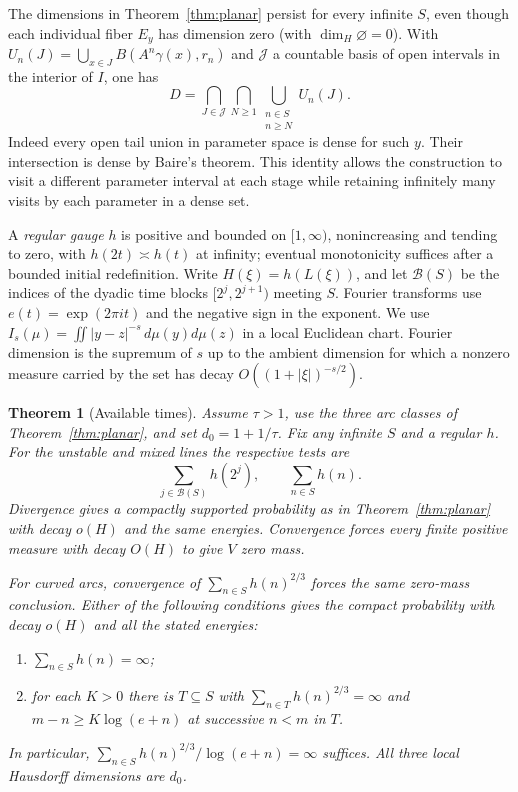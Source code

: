 \documentclass[11pt,a4paper,reqno]{amsart}
\newtheorem{theorem}{Theorem}[section]
\theoremstyle{definition}
\theoremstyle{remark}
\numberwithin{equation}{section}
\begin{document}
The dimensions in Theorem~\ref{thm:planar} persist for every infinite
\(S\), even though each individual fiber \(E_y\) has dimension zero
(with \(\dim_H\varnothing=0\)). With
\(U_n(J)=\bigcup_{x\in J}B(A^n\gamma(x),r_n)\) and \(\mathcal J\)
a countable basis of open intervals in the interior of \(I\), one has
\begin{equation}\label{eq:dense}
 D=\bigcap_{J\in\mathcal J}\bigcap_{N\ge1}
       \bigcup_{\substack{n\in S\\ n\ge N}}U_n(J).
\end{equation}
Indeed every open tail union in parameter space is dense for such \(y\).
Their intersection is dense by Baire's theorem. This identity allows the
construction to visit a different parameter interval at each stage while
retaining infinitely many visits by each parameter in a dense set.

A \emph{regular gauge} \(h\) is positive and bounded on \([1,\infty)\),
nonincreasing and tending to zero, with \(h(2t)\asymp h(t)\) at infinity;
eventual monotonicity suffices after a bounded initial redefinition. Write
\(H(\xi)=h(L(\xi))\), and let \(\mathcal B(S)\) be the indices of the
dyadic time blocks \([2^j,2^{j+1})\) meeting \(S\). Fourier transforms use
\(e(t)=\exp(2\pi i t)\) and the negative sign in the exponent. We use
\(I_s(\mu)=\iint |y-z|^{-s}\,d\mu(y)d\mu(z)\) in a local Euclidean chart. Fourier
dimension is the supremum of \(s\) up to the ambient dimension for which a
nonzero measure carried by the set has decay \(O((1+|\xi|)^{-s/2})\).

\begin{theorem}[Available times]\label{thm:sparse}
Assume \(\tau>1\), use the three arc classes of Theorem~\ref{thm:planar},
and set \(d_0=1+1/\tau\). Fix any infinite \(S\) and a regular \(h\).
For the unstable and mixed lines the respective tests are
\begin{equation}\label{eq:tests}
        \sum_{j\in\mathcal B(S)}h(2^j),\qquad \sum_{n\in S}h(n).
\end{equation}
Divergence gives a compactly supported probability as in
Theorem~\ref{thm:planar} with decay \(o(H)\) and the same energies.
Convergence forces every finite positive measure with decay \(O(H)\)
to give \(V\) zero mass.

For curved arcs, convergence of \(\sum_{n\in S}h(n)^{2/3}\) forces the
same zero-mass conclusion. Either of the following conditions gives the
compact probability with decay \(o(H)\) and all the stated energies:
\begin{enumerate}
\item \(\sum_{n\in S}h(n)=\infty\);
\item for each \(K>0\) there is \(T\subseteq S\) with
\(\sum_{n\in T}h(n)^{2/3}=\infty\) and \(m-n\ge K\log(e+n)\)
at successive \(n<m\) in \(T\).
\end{enumerate}
In particular, \(\sum_{n\in S}h(n)^{2/3}/\log(e+n)=\infty\)
suffices. All three local Hausdorff dimensions are \(d_0\).
\end{theorem}
\end{document}
